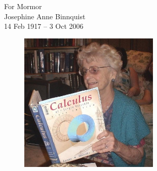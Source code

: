 \vspace{4cm}
\begin{center}
For Mormor \\
Josephine Anne Binnquist \\
14 Feb 1917 -- 3 Oct 2006
\end{center}

\begin{figure}[!h]
    \centering
    \includegraphics[width=0.6\textwidth]{mormor.jpg}
\end{figure}
